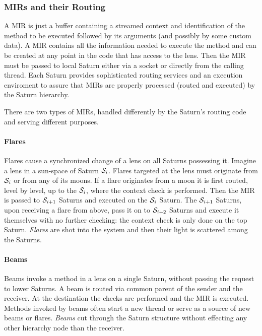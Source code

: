 \documentclass[final]{siamltex}
\begin{document}
\subsubsection{MIRs and their Routing}

A MIR is just a buffer containing a streamed context and
identification of the method to be executed followed by its arguments
(and possibly by some custom data). A MIR contains all the information
needed to execute the method and can be created at any point in the
code that has access to the lens. Then the MIR must be passed to local
Saturn either via a socket or directly from the calling thread.
Each Saturn provides sophisticated routing services and an
execution enviroment to assure that MIRs are properly processed (routed and
executed) by the Saturn hierarchy.

There are two types of MIRs, handled differently by the Saturn's
routing code and serving different purposes.

\paragraph{Flares}
Flares cause a synchronized change of a lens on all Saturns possessing
it.  Imagine a lens in a sun-space of Saturn ${\cal S}_i$. Flares
targeted at the lens must originate from ${\cal S}_i$ or from any of
its moons.  If a flare originates from a moon it is first routed,
level by level, up to the ${\cal S}_i$, where the context check is
performed. Then the MIR is passed to ${\cal S}_{i+1}$ Saturns and
executed on the ${\cal S}_i$ Saturn. The ${\cal S}_{i+1}$ Saturns,
upon receiving a flare from above, pass it on to ${\cal S}_{i+2}$
Saturns and execute it themselves with no further checking: the
context check is only done on the top Saturn. \emph{Flares} are shot
into the system and then their light is scattered among the Saturns.

\paragraph{Beams}
Beams invoke a method in a lens on a single Saturn, without passing
the request to lower Saturns. A beam is routed via common parent of
the sender and the receiver. At the destination the checks are
performed and the MIR is executed. Methods invoked by beams often
start a new thread or serve as a source of new beams or flares.
\emph{Beams} cut through the Saturn structure without effecting any
other hierarchy node than the receiver.
\end{document}
